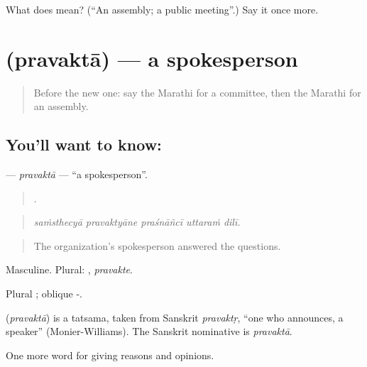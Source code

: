 \begin{tcolorbox}[breakable,colback=teal!4,colframe=teal!35!black,title={Before you move on}]
What does  mean? (\textquotedblleft{}An assembly; a public meeting\textquotedblright{}.) Say it once more.
\end{tcolorbox}
\section[\texorpdfstring{\mr{प्रवक्ता} (pravaktā)}{प्रवक्ता (pravaktā)}]{ (pravaktā) — a spokesperson}

\label{lesson:MR-C364-pravakta}



\begin{quote}
Before the new one: say the Marathi for a committee, then the Marathi for an assembly.
\end{quote}

\subsection*{You'll want to know: }
\textbf{} — \emph{pravaktā} — \textquotedblleft{}a spokesperson\textquotedblright{}.

\begin{quote}
    .
\end{quote}

\begin{quote}
\emph{saṁsthecyā pravaktyāne praśnāñcī uttaraṁ dilī.}
\end{quote}

\begin{quote}
The organization's spokesperson answered the questions.
\end{quote}

Masculine. Plural: , \emph{pravakte}.

Plural ; oblique -.

\begin{cousinweb}
\textbf{} (\emph{pravaktā}) is a tatsama, taken from Sanskrit \emph{pravaktṛ}, \textquotedblleft{}one who announces, a speaker\textquotedblright{} (Monier-Williams). The Sanskrit nominative is \emph{pravaktā}.
\end{cousinweb}

\begin{grammarlens}[title={What you've built}]
One more word for giving reasons and opinions.
\end{grammarlens}

